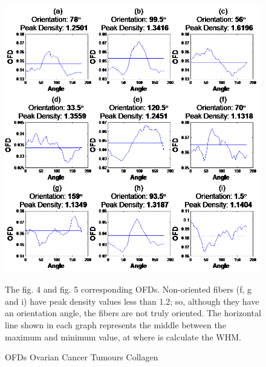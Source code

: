 \documentclass[12pt,a4paper]{article}
\begin{document}
\begin{figure}
  \includegraphics[width=\linewidth]{FiguresDisertation/figure7.png}
  \caption{OFDs Ovarian Cancer Tumours Collagen}
  \medskip
  \small
  The fig. 4 and fig. 5 corresponding OFDs. Non-oriented fibers (f, g and i) have peak density values less than 1.2; so, although they have an orientation angle, the fibers are not truly oriented. The horizontal line shown in each graph represents the middle between the maximum and minimum value, at where is calculate the WHM.
  
\end{figure}
\end{document}

